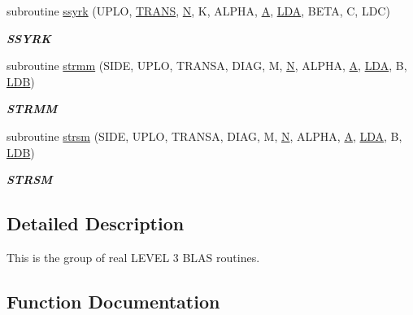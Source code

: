 \begin{DoxyCompactItemize}
subroutine \hyperlink{group__single__blas__level3_gae953a93420ca237670f5c67bbde9d9ff}{ssyrk} (U\+P\+L\+O, \hyperlink{superlu__enum__consts_8h_a0c4e17b2d5cea33f9991ccc6a6678d62a1f61e3015bfe0f0c2c3fda4c5a0cdf58}{T\+R\+A\+N\+S}, \hyperlink{polmisc_8c_a0240ac851181b84ac374872dc5434ee4}{N}, K, A\+L\+P\+H\+A, \hyperlink{classA}{A}, \hyperlink{example__user_8c_ae946da542ce0db94dced19b2ecefd1aa}{L\+D\+A}, B\+E\+T\+A, C, L\+D\+C)
\begin{DoxyCompactList}\small\item\em {\bfseries S\+S\+Y\+R\+K} \end{DoxyCompactList}\item 
subroutine \hyperlink{group__single__blas__level3_ga5a8ec25aba550c224cf6941fca7a2c98}{strmm} (S\+I\+D\+E, U\+P\+L\+O, T\+R\+A\+N\+S\+A, D\+I\+A\+G, M, \hyperlink{polmisc_8c_a0240ac851181b84ac374872dc5434ee4}{N}, A\+L\+P\+H\+A, \hyperlink{classA}{A}, \hyperlink{example__user_8c_ae946da542ce0db94dced19b2ecefd1aa}{L\+D\+A}, B, \hyperlink{example__user_8c_a50e90a7104df172b5a89a06c47fcca04}{L\+D\+B})
\begin{DoxyCompactList}\small\item\em {\bfseries S\+T\+R\+M\+M} \end{DoxyCompactList}\item 
subroutine \hyperlink{group__single__blas__level3_ga9893cceb3ffc7ce400eee405970191b3}{strsm} (S\+I\+D\+E, U\+P\+L\+O, T\+R\+A\+N\+S\+A, D\+I\+A\+G, M, \hyperlink{polmisc_8c_a0240ac851181b84ac374872dc5434ee4}{N}, A\+L\+P\+H\+A, \hyperlink{classA}{A}, \hyperlink{example__user_8c_ae946da542ce0db94dced19b2ecefd1aa}{L\+D\+A}, B, \hyperlink{example__user_8c_a50e90a7104df172b5a89a06c47fcca04}{L\+D\+B})
\begin{DoxyCompactList}\small\item\em {\bfseries S\+T\+R\+S\+M} \end{DoxyCompactList}\end{DoxyCompactItemize}


\subsection{Detailed Description}
This is the group of real L\+E\+V\+E\+L 3 B\+L\+A\+S routines. 

\subsection{Function Documentation}
\hypertarget{group__single__blas__level3_gafe51bacb54592ff5de056acabd83c260}{}
